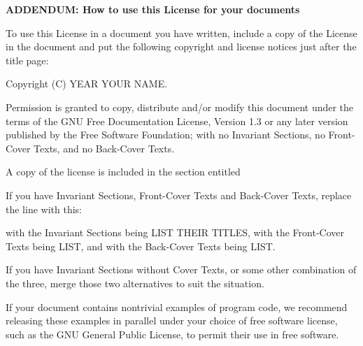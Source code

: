 \vspace{0.7cm}
\textbf{\Large{ADDENDUM: How to use this License for your documents}}

To use this License in a document you have written, include
a copy of the License in the document and put the following
copyright and license notices just after the title page:

\begin{myindentpara}{2cm}
Copyright (C)  YEAR  YOUR NAME.

Permission is granted to copy, distribute and/or modify this document
under the terms of the GNU Free Documentation License, Version 1.3
or any later version published by the Free Software Foundation;
with no Invariant Sections, no Front-Cover Texts, and no Back-Cover
Texts.  

A copy of the license is included in the section entitled 
\end{myindentpara}

If you have Invariant Sections, Front-Cover Texts and
Back-Cover Texts, replace the  line
with this:


\begin{myindentpara}{2cm}
with the Invariant Sections being LIST THEIR TITLES, with
the Front-Cover Texts being LIST, and with the Back-Cover Texts
being LIST.
\end{myindentpara}

If you have Invariant Sections without Cover Texts, or some
other combination of the three, merge those two alternatives
to suit the situation.

If your document contains nontrivial examples of program code,
we recommend releasing these examples in parallel under your
choice of free software license, such as the GNU General
Public License, to permit their use in free software.

